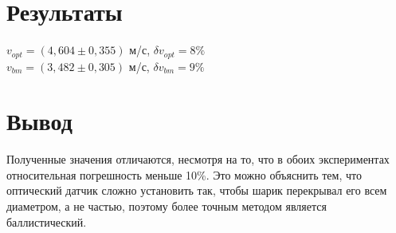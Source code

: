 \documentclass[12pt]{article}
\begin{document}
	\section{Результаты}
	$v_{opt}=(4{,}604\pm0{,}355)$ м/с, $\delta v_{opt}=8\%$\\	
	$v_{bm}=(3{,482}\pm0{,}305)$ м/с, $\delta v_{bm}=9\%$\\	
	\section{Вывод}
	Полученные значения отличаются, несмотря на то, что в обоих экспериментах относительная погрешность меньше 10\%. Это можно объяснить тем, что оптический датчик сложно установить так, чтобы шарик перекрывал его всем диаметром, а не частью, поэтому более точным методом является баллистический. 
\end{document}
